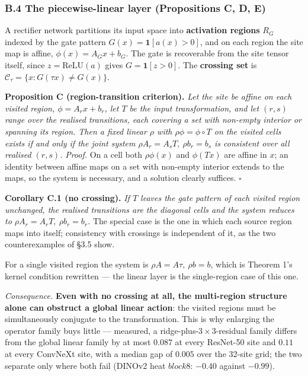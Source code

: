 \subsubsection*{B.4 The piecewise-linear layer (Propositions C, D, E)}

A rectifier network partitions its input space into \textbf{activation regions} $R_G$ indexed by the gate pattern $G(x)=\mathbf{1}[a(x)>0]$, and on each region the site map is affine, $\phi(x)=A_Gx+b_G$. The gate is recoverable from the site tensor itself, since $z=\mathrm{ReLU}(a)$ gives $G=\mathbf{1}[z>0]$. The \textbf{crossing set} is $\mathcal C_\tau=\{x:G(\tau x)\neq G(x)\}$.

\textbf{Proposition C (region-transition criterion).} \textit{Let the site be affine on each visited region, $\phi=A_rx+b_r$, let $T$ be the input transformation, and let $(r,s)$ range over the realised transitions, each covering a set with non-empty interior or spanning its region. Then a fixed linear $\rho$ with $\rho\phi=\phi\circ T$ on the visited cells exists if and only if the joint system $\rho A_r=A_sT,\ \rho b_r=b_s$ is consistent over all realised $(r,s)$.} \textit{Proof.} On a cell both $\rho\phi(x)$ and $\phi(Tx)$ are affine in $x$; an identity between affine maps on a set with non-empty interior extends to the maps, so the system is necessary, and a solution clearly suffices. $\square$

\textbf{Corollary C.1 (no crossing).} \textit{If $T$ leaves the gate pattern of each visited region unchanged, the realised transitions are the diagonal cells and the system reduces to $\rho A_r=A_rT,\ \rho b_r=b_r$.} The special case is the one in which each source region maps into itself; consistency with crossings is independent of it, as the two counterexamples of \S{}3.5 show.

For a single visited region the system is $\rho A=A\tau,\ \rho b=b$, which is Theorem 1's kernel condition rewritten --- the linear layer is the single-region case of this one.

\textit{Consequence.} \textbf{Even with no crossing at all, the multi-region structure alone can obstruct a global linear action}: the visited regions must be simultaneously conjugate to the transformation. This is why enlarging the operator family buys little --- measured, a ridge-plus-$3\times3$-residual family differs from the global linear family by at most $0.087$ at every ResNet-50 site and $0.11$ at every ConvNeXt site, with a median gap of $0.005$ over the 32-site grid; the two separate only where both fail (DINOv2 heat $block8$: $-0.40$ against $-0.99$).

